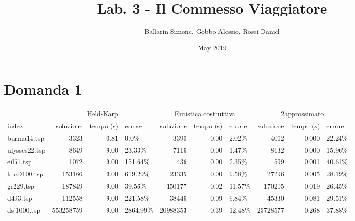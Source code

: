 \documentclass{article}
\title{Lab. 3 - Il Commesso Viaggiatore}
\author{Ballarin Simone, Gobbo Alessio, Rossi Daniel}
\date{May 2019}
\begin{document}
\maketitle

\section*{Domanda 1}
\begin{table}
\begin{adjustbox}{width=\columnwidth}
\begin{tabular}{lrrlrrlrrl}
	\toprule
	{} & \multicolumn{3}{c}{Held-Karp} & \multicolumn{3}{c}{Euristica costruttiva} & \multicolumn{3}{c}{2\-approssimato} \\
	index         & soluzione & tempo (s) & errore    & soluzione & tempo (s) & errore  & soluzione & tempo (s) & errore  \\
	\midrule
	burma14.tsp   & 3323      & 0.81      & 0.0\%     & 3390      & 0.00      & 2.02\%  & 4062      & 0.000     & 22.24\% \\
	ulysses22.tsp & 8649      & 9.00      & 23.33\%   & 7116      & 0.00      & 1.47\%  & 8132      & 0.000     & 15.96\% \\
	eil51.tsp     & 1072      & 9.00      & 151.64\%  & 436       & 0.00      & 2.35\%  & 599       & 0.001     & 40.61\% \\
	kroD100.tsp   & 153166    & 9.00      & 619.29\%  & 23335     & 0.00      & 9.58\%  & 27296     & 0.005     & 28.19\% \\
	gr229.tsp     & 187849    & 9.00      & 39.56\%   & 150177    & 0.02      & 11.57\% & 170205    & 0.019     & 26.45\% \\
	d493.tsp      & 112558    & 9.00      & 221.58\%  & 38446     & 0.09      & 9.84\%  & 45330     & 0.081     & 29.51\% \\
	dsj1000.tsp   & 553258759 & 9.00      & 2864.99\% & 20988353  & 0.39      & 12.48\% & 25728577  & 0.268     & 37.88\% \\
	\bottomrule
\end{tabular}
\end{adjustbox}
\end{table}	
\end{document}
